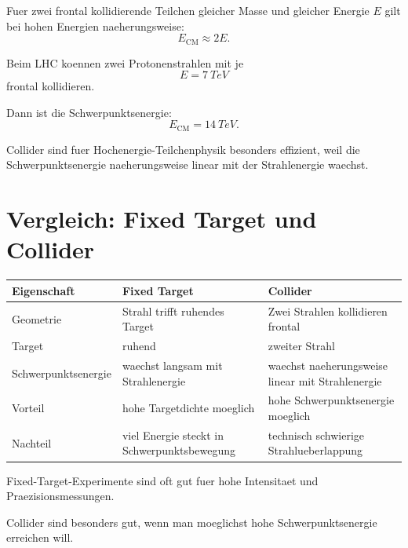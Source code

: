 \begin{formulabox}
Fuer zwei frontal kollidierende Teilchen gleicher Masse und gleicher Energie $E$
gilt bei hohen Energien naeherungsweise:
\[
    E_{\mathrm{CM}}
    \approx
    2E.
\]
\end{formulabox}

\begin{examplebox}
Beim LHC koennen zwei Protonenstrahlen mit je
\[
    E=\SI{7}{TeV}
\]
frontal kollidieren.

Dann ist die Schwerpunktsenergie:
\[
    E_{\mathrm{CM}}
    =
    \SI{14}{TeV}.
\]
\end{examplebox}

\begin{examtipbox}
Collider sind fuer Hochenergie-Teilchenphysik besonders effizient, weil die
Schwerpunktsenergie naeherungsweise linear mit der Strahlenergie waechst.
\end{examtipbox}

\section{Vergleich: Fixed Target und Collider}

\begin{center}
\begin{tabular}{|p{4.2cm}|p{5.3cm}|p{5.3cm}|}
\hline
Eigenschaft & Fixed Target & Collider \\
\hline
Geometrie & Strahl trifft ruhendes Target & Zwei Strahlen kollidieren frontal \\
\hline
Target & ruhend & zweiter Strahl \\
\hline
Schwerpunktsenergie & waechst langsam mit Strahlenergie & waechst naeherungsweise linear mit Strahlenergie \\
\hline
Vorteil & hohe Targetdichte moeglich & hohe Schwerpunktsenergie moeglich \\
\hline
Nachteil & viel Energie steckt in Schwerpunktsbewegung & technisch schwierige Strahlueberlappung \\
\hline
\end{tabular}
\end{center}

\begin{conceptbox}
Fixed-Target-Experimente sind oft gut fuer hohe Intensitaet und Praezisionsmessungen.

Collider sind besonders gut, wenn man moeglichst hohe Schwerpunktsenergie erreichen
will.
\end{conceptbox}

